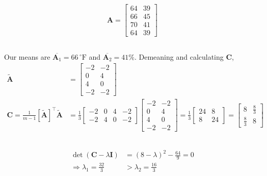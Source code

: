 \documentclass[]{article}
\newcommand{\tpose}[1]{\left[#1\right]^{\! \top} \!\!}
\begin{document}
\begin{equation}
	\bm{A} =
	\begin{bmatrix}
	64 & 39 \\
	66 & 45 \\
	70 & 41 \\
	64 & 39
	\end{bmatrix}
\end{equation}

\subsection{}

Our means are \(\overline{\bm{A}_1} = 66 \, ^{\circ} \text{F}\) and \(\overline{\bm{A}_2} = 41 \%\).
Demeaning and calculating \(\bm{C}\),
\begin{align}
	\widetilde{\bm{A}} &=
	\begin{bmatrix}
	-2 & -2 \\
	0 & 4 \\
	4 & 0 \\
	-2 & -2
	\end{bmatrix} \\
	\bm{C} = \frac{1}{m - 1} \tpose{\widetilde{\bm{A}}} \widetilde{\bm{A}} &=
	\frac{1}{3} \begin{bmatrix}
	-2 & 0 & 4 & -2 \\
	-2 & 4 & 0 & -2
	\end{bmatrix}
	\begin{bmatrix}
	-2 & -2 \\
	0 & 4 \\
	4 & 0 \\
	-2 & -2
	\end{bmatrix} =
	\frac{1}{3} \begin{bmatrix}
	24 & 8 \\
	8 & 24
	\end{bmatrix} =
	\begin{bmatrix}
	8 & \frac{8}{3} \\
	\frac{8}{3} & 8
	\end{bmatrix}
\end{align}

\subsection{}

\begin{align}
	\det(\bm{C} - \lambda \bm{I}) &= (8 - \lambda)^2 - \frac{64}{9} = 0 \\
	\Rightarrow \lambda_1 = \frac{32}{3} &> \lambda_2 = \frac{16}{3}
\end{align}
\end{document}
